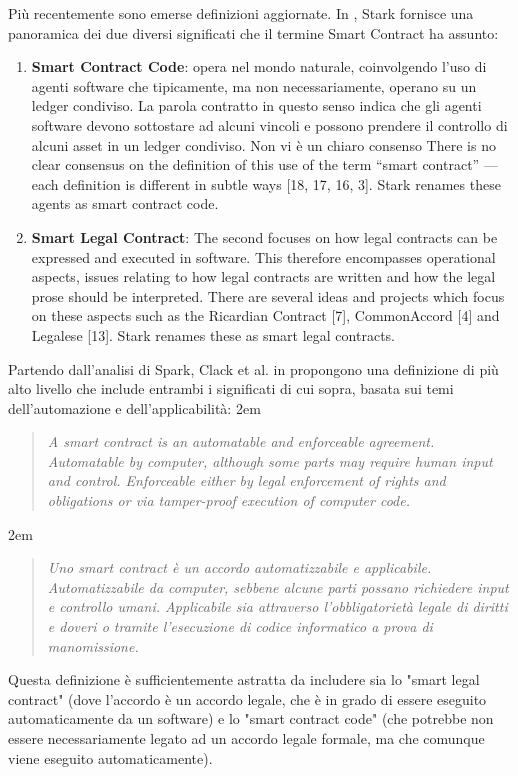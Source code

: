 Più recentemente sono emerse definizioni aggiornate.
In \cite{making-sense-of-bsc}, Stark fornisce una panoramica dei due diversi significati che il termine
Smart Contract ha assunto:
\begin{enumerate}
	\item \textbf{Smart Contract Code}: opera nel mondo naturale,
	      coinvolgendo l'uso di agenti software che tipicamente,
	      ma non necessariamente, operano su un ledger condiviso. La parola contratto in questo senso
	      indica che gli agenti software devono sottostare ad alcuni vincoli e possono prendere il controllo
	      di alcuni asset in un ledger condiviso. Non vi è un chiaro consenso  There is no clear consensus on the
	      definition of this use of the term “smart contract” — each definition is different in subtle
	      ways [18, 17, 16, 3]. Stark renames these agents as smart contract code.
	\item \textbf{Smart Legal Contract}: The second focuses on how legal contracts can be expressed and executed in software.
	      This therefore encompasses operational aspects, issues relating to how legal contracts
	      are written and how the legal prose should be interpreted. There are several ideas and
	      projects which focus on these aspects such as the Ricardian Contract [7], CommonAccord
		      [4] and Legalese [13]. Stark renames these as smart legal contracts.
\end{enumerate}
Partendo dall'analisi di Spark, Clack et al. in \cite{Clack2016SmartCT} propongono una definizione
di più alto livello che include entrambi i significati di cui sopra, basata sui temi
dell'automazione e dell'applicabilità:
\begingroup
\advance\leftmargini 2em
\begin{quote}
	{
		{\em A smart contract is an automatable and enforceable agreement. Automatable by computer,
				although some parts may require human input and control. Enforceable either by legal
				enforcement of rights and obligations or via tamper-proof execution of computer code.  }
	}
\end{quote}
\endgroup
\begingroup
\advance\leftmargini 2em
\begin{quote}
	{
		{\em Uno smart contract è un accordo automatizzabile e applicabile. Automatizzabile da computer,
				sebbene alcune parti possano richiedere input e controllo umani. Applicabile sia attraverso
				l'obbligatorietà legale di diritti e doveri o tramite
				l'esecuzione di codice informatico a prova di manomissione.}
	}
\end{quote}
\endgroup
Questa definizione è sufficientemente astratta da includere sia lo "smart legal contract"
(dove l'accordo è un accordo legale, che è in grado di essere eseguito automaticamente da un software)
e lo "smart contract code" (che potrebbe non essere necessariamente legato ad un accordo legale formale,
ma che comunque viene eseguito automaticamente).




